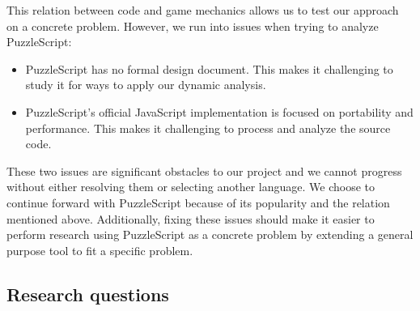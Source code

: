 This relation between code and game mechanics allows us to test our approach on a concrete problem. However, we run into issues when trying to analyze PuzzleScript:
\begin{itemize}
    \item PuzzleScript has no formal design document. This makes it challenging to study it for ways to apply our dynamic analysis.
    \item PuzzleScript's official JavaScript implementation is focused on portability and performance. This makes it challenging to process and analyze the source code.
\end{itemize}

These two issues are significant obstacles to our project and we cannot progress without either resolving them or selecting another language. We choose to continue forward with PuzzleScript because of its popularity and the relation mentioned above. Additionally, fixing these issues should make it easier to perform research using PuzzleScript as a concrete problem by extending a general purpose tool to fit a specific problem.




\subsection{Research questions}


